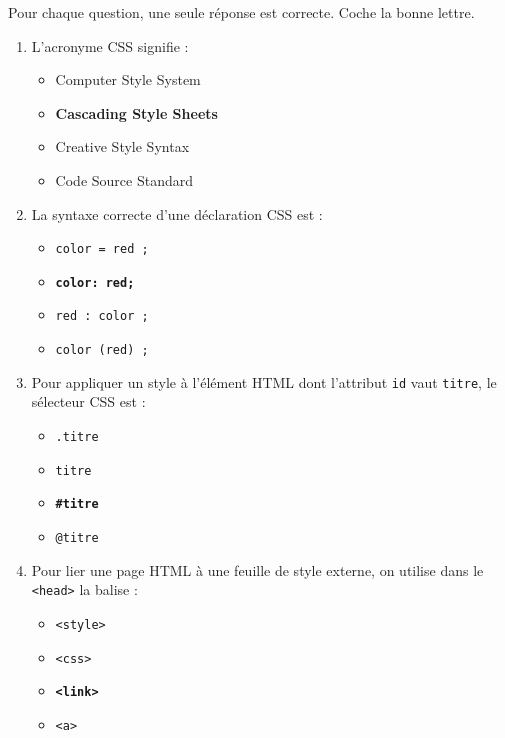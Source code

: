 \documentclass[11pt]{article}
\newcommand{\cle}[1]{{\popxbold\color{popdark}#1}}
\begin{document}
\begin{exercice}
Pour chaque question, une seule réponse est correcte. Coche la bonne lettre.

\begin{enumerate}[label=\alph*)]
  \item L'acronyme \cle{CSS} signifie :
  \begin{itemize}
    \item Computer Style System
    \item \textbf{Cascading Style Sheets}
    \item Creative Style Syntax
    \item Code Source Standard
  \end{itemize}

  \item La syntaxe correcte d'une déclaration CSS est :
  \begin{itemize}
    \item \texttt{color = red ;}
    \item \textbf{\texttt{color: red;}}
    \item \texttt{red : color ;}
    \item \texttt{color (red) ;}
  \end{itemize}

  \item Pour appliquer un style à l'élément \cle{HTML} dont l'attribut \texttt{id} vaut \texttt{titre}, le sélecteur \cle{CSS} est :
  \begin{itemize}
    \item \texttt{.titre}
    \item \texttt{titre}
    \item \textbf{\texttt{\#titre}}
    \item \texttt{@titre}
  \end{itemize}

  \item Pour lier une page \cle{HTML} à une feuille de style externe, on utilise dans le \texttt{<head>} la balise :
  \begin{itemize}
    \item \texttt{<style>}
    \item \texttt{<css>}
    \item \textbf{\texttt{<link>}}
    \item \texttt{<a>}
  \end{itemize}
\end{enumerate}
\end{exercice}
\end{document}
